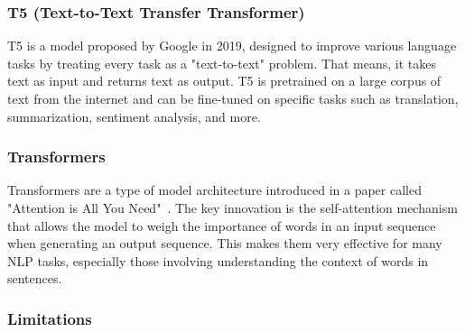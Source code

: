 \documentclass{article}
\begin{document}
\subsubsection{T5 (Text-to-Text Transfer Transformer)}
T5 is a model proposed by Google in 2019, designed to 
improve various language tasks by treating every task as a "text-to-text" problem. That 
means, it takes text as input and returns text as output. T5 is pretrained on a large corpus 
of text from the internet and can be fine-tuned on specific tasks such as translation, 
summarization, sentiment analysis, and more.

\subsubsection{Transformers}
Transformers are a type of model architecture introduced in a paper called 
"Attention is All You Need"~\cite{ASNG17}. The key innovation is the self-attention mechanism 
that allows the model to weigh the importance of words in an input sequence when generating 
an output sequence. This makes them very effective for many NLP tasks, especially those 
involving understanding the context of words in sentences.

\subsubsection*{Limitations}
\end{document}
